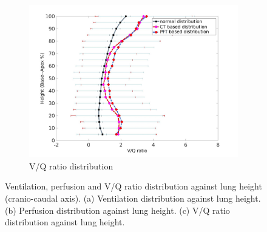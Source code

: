 \begin{figure}[htbp]
\begin{subfigure}{.6\linewidth}
  \includegraphics[width=\linewidth,trim={{.0\wd0} {.0\wd0} {.0\wd0} {.0\wd0}},clip]{ModelBasedAnalysis/Image/VQAgainstLungHeight.jpg}
  \caption{V/Q ratio distribution}
  \label{fig:MainVQDistribution-c}
\end{subfigure}
\caption{ Ventilation, perfusion and V/Q ratio distribution against lung height (cranio-caudal axis). (a) Ventilation distribution against lung height. (b) Perfusion distribution against lung height. (c) V/Q ratio distribution against lung height.}
\label{fig:MainVQDistribution}
\end{figure}


